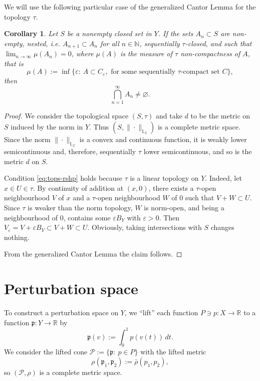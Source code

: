 \documentclass[12pt,leqno]{article}
\newtheorem{cor}[thm]{Corollary}      %
\theoremstyle{definition}
\theoremstyle{remark}
\def\ds{\displaystyle}
\def\R{\mathbb{R}}
\def\L{\mathbb{L}}
\begin{document}
We will use the following particular case of the generalized Cantor Lemma for the  topology $\tau$.
\begin{cor}\label{cor:Cantor}
Let $S$ be a nonempty closed set in $Y$.
    If the sets $A_n\subset S$ are non-empty, nested, i.e. $A_{n+1}\subset A_n$ for all $n\in\mathbb{N}$, sequentially $\tau$-closed, and such that
    $\ds
        \lim_{n\to\infty} \mu(A_n) = 0$,
where $\mu (A)$ is the measure of $ \tau$ non-compactness of $A$, that is
   \begin{equation}\label{def:mu}
        \mu (A) := \inf\{\varepsilon:\ A \subset C_\varepsilon,\text{ for some sequentially }\tau \text{-compact set } C\},
 \end{equation}
    then
    $$
        \bigcap_{n=1}^\infty A_n \neq \varnothing.
    $$
\end{cor}
\begin{proof}
We consider the topological space $(S,\tau)$ and take $d$ to be the metric on $S$ induced by the norm in $Y$. Thus $(S, \|\cdot\|_{\L_2})$ is a complete metric space. Since the norm $\|\cdot\|_{\L_2}$ is a convex and continuous function, it is weakly lower semicontinuous and, therefore, sequentially $\tau$ lower semicontinuous, and so is the metric $d$ on $S$.

Condition \eqref{eq:tops-rshp} holds because $\tau$ is a linear topology on $Y$. Indeed, let $x\in U\in \tau$. By continuity of addition at $(x,0)$, there exists a $\tau$-open neighbourhood $V$ of $x$ and a $\tau$-open neighbourhood $W$ of $0$ such that $V+W\subset U$. Since $\tau$ is weaker than the norm topology, $W$ is norm-open, and being a neighbourhood of $0$, contains some $\varepsilon B_Y$ with $\varepsilon>0$. Then $V_\varepsilon = V+\varepsilon B_Y\subset V+W\subset U$. Obviously, taking intersections with $S$ changes nothing.

From the generalized Cantor Lemma the claim follows.
\end{proof}

\section{Perturbation space}\label{sec:pert}

    To construct a perturbation space on $Y$, we ``lift'' each function $P\ni p:X\to \R$ to a function  $\mathfrak{p}: Y \to \mathbb{R}$ by
    $$
        \mathfrak{p}(v) := \int_0^1 p(v(t))\, dt.
    $$
    We consider the lifted cone
    $
        \mathcal{P} := \{ \mathfrak{p}:\ p\in P\}
    $
    with the lifted metric
    $$
         \rho (\mathfrak{p}_1,\mathfrak{p}_2) := \bar\rho (p_1,p_2),
    $$
    so $(\mathcal{P},\rho)$ is a complete metric space.
\end{document}
